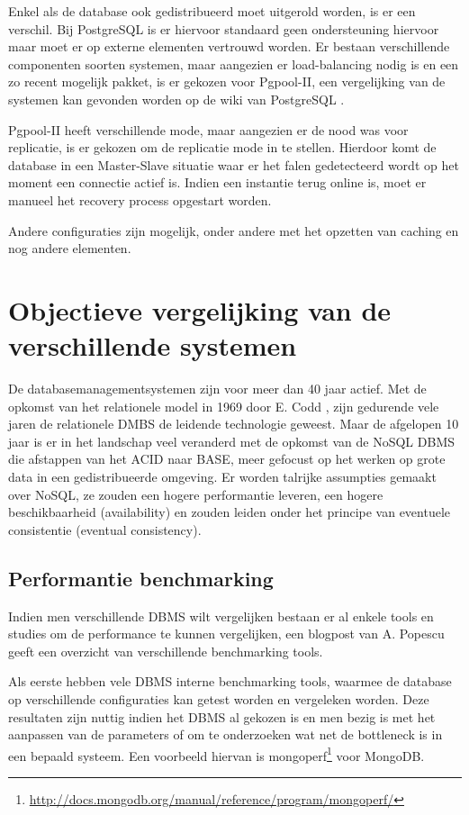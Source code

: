 Enkel als de database ook gedistribueerd moet uitgerold worden, is er een verschil. Bij PostgreSQL is er hiervoor standaard geen ondersteuning hiervoor maar moet er op externe elementen vertrouwd worden. Er bestaan verschillende componenten soorten systemen, maar aangezien er load-balancing nodig is en een zo recent mogelijk pakket, is er gekozen voor Pgpool-II, een vergelijking van de systemen kan gevonden worden op de wiki van PostgreSQL \cite{postgresql-clustering}. 

Pgpool-II heeft verschillende mode, maar aangezien er de nood was voor replicatie, is er gekozen om de replicatie mode in te stellen. Hierdoor komt de database in een Master-Slave situatie waar er het falen gedetecteerd wordt op het moment een connectie actief is. Indien een instantie terug online is, moet er manueel het recovery process opgestart worden. 

Andere configuraties zijn mogelijk, onder andere met het opzetten van caching en nog andere elementen. 

\section{Objectieve vergelijking van de verschillende systemen}
De databasemanagementsystemen zijn voor meer dan 40 jaar actief. Met de opkomst van het relationele model in 1969 door E. Codd \cite{Codd:1970:RMD:362384.362685}, zijn gedurende vele jaren de relationele DMBS de leidende technologie geweest. Maar de afgelopen 10 jaar is er in het landschap veel veranderd met de opkomst van de NoSQL DBMS die afstappen van het ACID naar BASE, meer gefocust op het werken op grote data in een gedistribueerde omgeving. 
Er worden talrijke assumpties gemaakt over NoSQL, ze zouden een hogere performantie leveren, een hogere beschikbaarheid (availability) en zouden leiden onder het principe van eventuele consistentie (eventual consistency). 

\subsection{Performantie benchmarking} 
Indien men verschillende DBMS wilt vergelijken bestaan er al enkele tools en studies om de performance te kunnen vergelijken, een blogpost van A. Popescu \cite{PopescuBenchmarkOverview} geeft een overzicht van verschillende benchmarking tools. 

Als eerste hebben vele DBMS interne benchmarking tools, waarmee de database op verschillende configuraties kan getest worden en vergeleken worden. Deze resultaten zijn nuttig indien het DBMS al gekozen is en men bezig is met het aanpassen van de parameters of om te onderzoeken wat net de bottleneck is in een bepaald systeem. Een voorbeeld hiervan is mongoperf\footnote{\url{http://docs.mongodb.org/manual/reference/program/mongoperf/}} voor MongoDB. 

